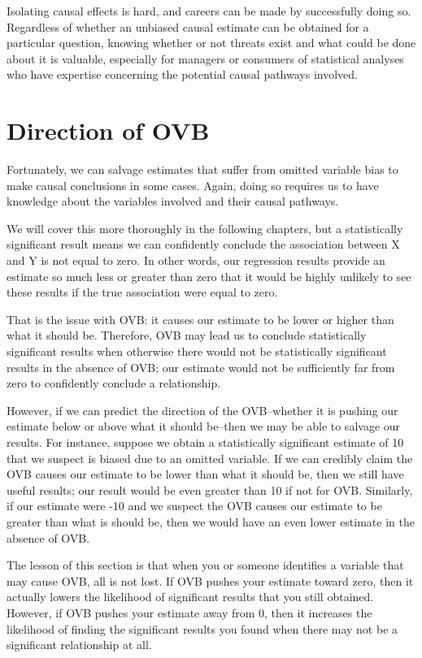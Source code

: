 \documentclass[
]{book}
\begin{document}
Isolating causal effects is hard, and careers can be made by successfully doing so. Regardless of whether an unbiased causal estimate can be obtained for a particular question, knowing whether or not threats exist and what could be done about it is valuable, especially for managers or consumers of statistical analyses who have expertise concerning the potential causal pathways involved.

\hypertarget{direction-of-ovb}{%
\section{Direction of OVB}\label{direction-of-ovb}}

Fortunately, we can salvage estimates that suffer from omitted variable bias to make causal conclusions in some cases. Again, doing so requires us to have knowledge about the variables involved and their causal pathways.

We will cover this more thoroughly in the following chapters, but a statistically significant result means we can confidently conclude the association between X and Y is not equal to zero. In other words, our regression results provide an estimate so much less or greater than zero that it would be highly unlikely to see these results if the true association were equal to zero.

That is the issue with OVB: it causes our estimate to be lower or higher than what it should be. Therefore, OVB may lead us to conclude statistically significant results when otherwise there would not be statistically significant results in the absence of OVB; our estimate would not be sufficiently far from zero to confidently conclude a relationship.

However, if we can predict the direction of the OVB--whether it is pushing our estimate below or above what it should be--then we may be able to salvage our results. For instance, suppose we obtain a statistically significant estimate of 10 that we suspect is biased due to an omitted variable. If we can credibly claim the OVB causes our estimate to be lower than what it should be, then we still have useful results; our result would be even greater than 10 if not for OVB. Similarly, if our estimate were -10 and we suspect the OVB causes our estimate to be greater than what is should be, then we would have an even lower estimate in the absence of OVB.

The lesson of this section is that when you or someone identifies a variable that may cause OVB, all is not lost. If OVB pushes your estimate toward zero, then it actually lowers the likelihood of significant results that you still obtained. However, if OVB pushes your estimate away from 0, then it increases the likelihood of finding the significant results you found when there may not be a significant relationship at all.
\end{document}
